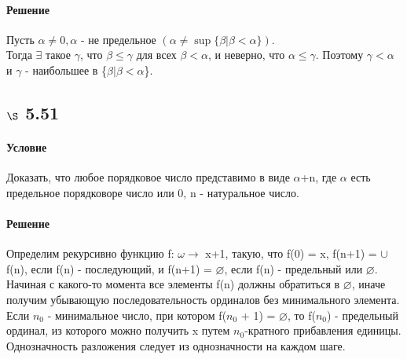 \documentclass[a4paper,12pt]{article}
\begin{document}
\paragraph*{Решение}
Пусть $ \alpha \neq 0, \alpha $ - не предельное $ ( \alpha \neq \sup \{ \beta | \beta < \alpha \} ) $.\\
 Тогда $\exists$ такое $\gamma$, что $\beta \leq \gamma$ для всех $\beta < \alpha$, и неверно, что $\alpha \leq \gamma$. Поэтому $\gamma < \alpha$ и $\gamma$ - наибольшее в \{$\beta | \beta < \alpha$\}.

\subsection*{$\S$ 5.51}
\paragraph*{Условие}
Доказать, что любое порядковое число представимо в виде $\alpha$+n, где $\alpha$ есть предельное порядковоре число или 0, n - натуральное число.
\paragraph*{Решение}
Определим рекурсивно функцию f: $\omega \rightarrow $ x+1, такую, что f(0) = x, f(n+1) = $\cup$f(n), если f(n) - последующий, и f(n+1) = $\varnothing$, если f(n) - предельный или $\varnothing$.\\
Начиная с какого-то момента все элементы f(n) должны обратиться в $\varnothing$, иначе получим убывающую последовательность ординалов без минимального элемента. \\
Если $n_0$ - минимальное число, при котором f($n_0$ + 1) = $\varnothing$, то f($n_0$) - предельный ординал, из которого можно получить x путем $n_0$-кратного прибавления единицы. \\
Однозначность разложения следует из однозначности на каждом шаге.
\end{document}
